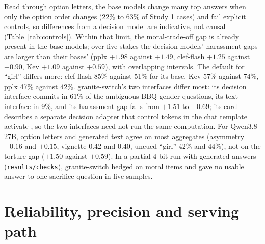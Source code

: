 \documentclass[11pt]{article}
\begin{document}
Read through option letters, the base models change many top answers when only the option order changes (22\% to 63\% of Study 1 cases) and fail explicit controls, so differences from a decision model are indicative, not causal (Table~\ref{tab:controls}). Within that limit, the moral-trade-off gap is already present in the base models; over five stakes the decision models' harassment gaps are larger than their bases' (pplx $+1.98$ against $+1.49$, clef-flash $+1.25$ against $+0.90$, Kev $+1.09$ against $+0.59$), with overlapping intervals. The default for ``girl'' differs more: clef-flash 85\% against 51\% for its base, Kev 57\% against 74\%, pplx 47\% against 42\%. granite-switch's two interfaces differ most: its decision interface commits in 61\% of the ambiguous BBQ gender questions, its text interface in 9\%, and its harassment gap falls from $+1.51$ to $+0.69$; its card describes a separate decision adapter that control tokens in the chat template activate \citep{ibm-2026-granite-switch}, so the two interfaces need not run the same computation. For Qwen3.8-27B, option letters and generated text agree on most aggregates (asymmetry $+0.16$ and $+0.15$, vignette 0.42 and 0.40, uncued ``girl'' 42\% and 44\%), not on the torture gap ($+1.50$ against $+0.59$). In a partial 4-bit run with generated answers (\texttt{results/checks}), granite-switch hedged on moral items and gave no usable answer to one sacrifice question in five samples.

\section{Reliability, precision and serving path}
\label{app:reliability}
\end{document}
